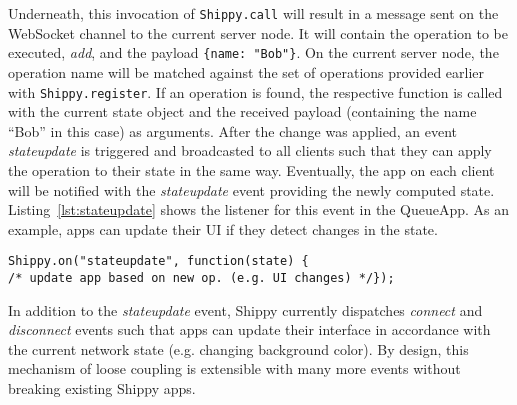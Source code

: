 Underneath, this invocation of \texttt{Shippy.call} will result in a message sent on the WebSocket channel to the current server node.
It will contain the operation to be executed, \textit{add}, and the payload \texttt{\{name: "Bob"\}}.
On the current server node, the operation name will be matched against the set of operations provided earlier with \texttt{Shippy.register}.
If an operation is found, the respective function is called with the current state object and the received payload (containing the name ``Bob'' in this case) as arguments.
After the change was applied, an event \textit{stateupdate} is triggered and broadcasted to all clients such that they can apply the operation to their state in the same way.
Eventually, the app on each client will be notified with the \textit{stateupdate} event providing the newly computed state.
Listing~\ref{lst:stateupdate} shows the listener for this event in the QueueApp. As an example, apps can update their UI if they detect changes in the state.

\begin{lstlisting}[caption={stateupdate listener},label={lst:stateupdate}]
Shippy.on("stateupdate", function(state) {
/* update app based on new op. (e.g. UI changes) */});
\end{lstlisting}

In addition to the \textit{stateupdate} event, Shippy currently dispatches \textit{connect} and \textit{disconnect} events such that apps can update their interface in accordance with the current network state (e.g. changing background color).
By design, this mechanism of loose coupling is extensible with many more events without breaking existing Shippy apps.
